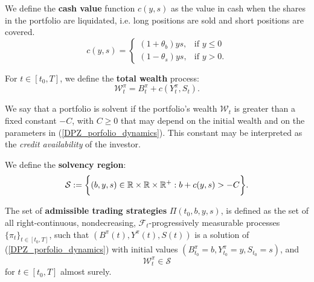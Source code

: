 

\begin{Definition}
We define the \textbf{cash value} function $c(y,s)$ as the value in cash when the shares in the portfolio are liquidated, i.e.  
long positions are sold and short positions are covered.
\begin{equation}\label{cost_function}
c(y,s) = \begin{cases} 
(1+\theta_b)ys, & \mbox{if } y\leq 0 \\ 
(1-\theta_s)ys, & \mbox{if } y>0 . 
\end{cases} 
\end{equation} 
\end{Definition}
\begin{Definition}
For $t\in [t_0,T]$, we define the \textbf{total wealth} process:
\begin{equation}\label{wealth_process}
 \mathcal{W}^{\pi}_t = B^{\pi}_t + c(Y^{\pi}_t,S_t).
\end{equation} 
\end{Definition}
We say that a portfolio is solvent if the portfolio's wealth $\mathcal{W}_t$ is greater than a fixed constant $-C$, with 
$C\geq0$ that may depend on the initial wealth and on the parameters in (\ref{DPZ_porfolio_dynamics}). 
This constant may be interpreted as the \emph{credit availability} of the investor.
\begin{Definition}
We define the \textbf{solvency region}:
\begin{equation}\label{solvency_region}
 \mathcal{S} := \biggl\{ (b,y,s) \in \mathbb{R} \times \mathbb{R} \times \mathbb{R}^+ : b + c(y,s) > -C  \biggr\}.
\end{equation} 
\end{Definition}
\begin{Definition}\label{admissible_strategies1}
The set of \textbf{admissible trading strategies} $\Pi(t_0,b,y,s)$, is defined   
as the set of all right-continuous, nondecreasing, $\mathcal{F}_t$-progressively measurable processes  
$\{\pi_t\}_{t \in [t_0,T]}$, such that $(B^\pi(t),Y^\pi(t),S(t))$ is a solution of (\ref{DPZ_porfolio_dynamics}) with initial values $(B^\pi_{t_0} = b, Y^\pi_{t_0} = y, S_{t_0} = s)$, 
and 
\begin{equation}
 \mathcal{W}^{\pi}_t \in \mathcal{S}
\end{equation}
for $t \in [t_0,T]$ almost surely.
\end{Definition}


